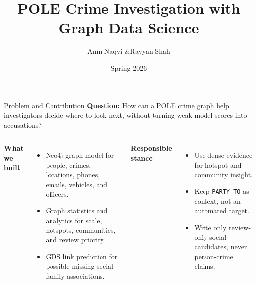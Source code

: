 ﻿\documentclass[aspectratio=169]{beamer}
\title{POLE Crime Investigation with Graph Data Science}
\author{Amn Naqvi \quad\&\quad Rayyan Shah}
\institute{CS343 Graph Data Science \quad|\quad Project Group 4}
\date{Spring 2026}
\newcommand{\tinycode}[1]{\texttt{\scriptsize #1}}
\begin{document}
\begin{frame}
  \titlepage
\end{frame}

\begin{frame}{Problem and Contribution}
  \textbf{Question:} How can a POLE crime graph help investigators decide where to look next, without turning weak model scores into accusations?

  \vspace{0.25cm}
  \begin{columns}[T]
      \textbf{What we built}
      \begin{itemize}
        \item Neo4j graph model for people, crimes, locations, phones, emails, vehicles, and officers.
        \item Graph statistics and analytics for scale, hotspots, communities, and review priority.
        \item GDS link prediction for possible missing social-family associations.
      \end{itemize}

      \textbf{Responsible stance}
      \begin{itemize}
        \item Use dense evidence for hotspot and community insight.
        \item Keep \tinycode{PARTY\_TO} as context, not an automated target.
        \item Write only review-only social candidates, never person-crime claims.
      \end{itemize}
  \end{columns}
\end{frame}
\end{document}

